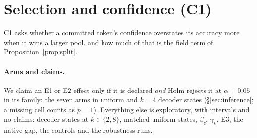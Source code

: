 %

\providecommand{\Cres}[1]{\ifcsname #1\endcsname\csname #1\endcsname\else\textbf{?}\fi}
\providecommand{\CresCI}[1]{\ensuremath{\Cres{#1}\;[\Cres{#1Lo},\,\Cres{#1Hi}]}}
\ifdefined\Cfitbox\else\newsavebox{\Cfitbox}\fi
\providecommand{\Cfit}[1]{\sbox{\Cfitbox}{#1}%
  \ifdim\wd\Cfitbox>\linewidth\resizebox{\linewidth}{!}{\usebox{\Cfitbox}}\else\usebox{\Cfitbox}\fi}
\providecommand{\Cpending}[1]{\fbox{\parbox{0.9\linewidth}{\centering\small #1: pending results
  (\texttt{scripts/c1\_paper\_outputs.py})}}}

\section{Selection and confidence (C1)}
\label{sec:c1}

C1 asks whether a committed token's confidence overstates its accuracy more when it wins a larger pool,
and how much of that is the field term of Proposition~\ref{prop:split}.

\paragraph{Arms and claims.}
We claim an E1 or E2 effect only if it is declared \emph{and} Holm rejects it at $\alpha=0.05$
in its family: the seven arms in uniform and $k{=}4$ decoder states (\S\ref{sec:inference};
a missing cell counts as $p=1$).
Everything else is exploratory, with intervals and no claims: decoder states at
$k\in\{2,8\}$, matched uniform states, $\beta_z$, $\gamma_k$, E3, the native gap, the controls
and the robustness runs.

